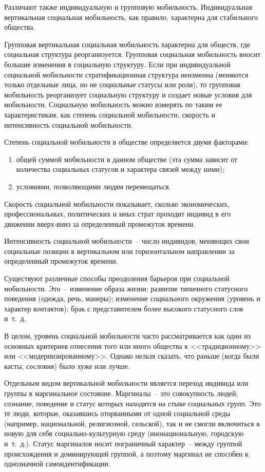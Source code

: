   Различают также индивидуальную и групповую мобильность. Индивидуальная
  вертикальная социальная мобильность, как правило, характерна для стабильного
  общества.

  Групповая вертикальная социальная мобильность характерна для обществ, где
  социальная структура реорганизуется. Групповая социальная мобильность вносит
  большие изменения в социальную структуру. Если при индивидуальной социальной
  мобильности стратификационная структура неизменна (меняются только отдельные
  лица, но не социальные статусы или роли), то групповая мобильность
  реорганизует социальную структуру и создает новые условия для мобильности.
  Социальную мобильность можно измерять по таким ее характеристикам, как
  степень социальной мобильности, скорость и интенсивность социальной
  мобильности.

  Степень социальной мобильности в обществе определяется двумя факторами:
  \begin{enumerate}
    \item общей суммой мобильности в данном обществе (эта сумма зависит от
      количества социальных статусов и характера связей между ними);
    \item условиями, позволяющими людям перемещаться.
  \end{enumerate}

  Скорость социальной мобильности показывает, сколько экономических,
  профессиональных, политических и иных страт проходит индивид в его движении
  вверх-вниз за определенный промежуток времени.

  Интенсивность социальной мобильности~-- число индивидов, меняющих свои
  социальные позиции в вертикальном или горизонтальном направлении за
  определенный промежуток времени.

  Существуют различные способы преодоления барьеров при социальной мобильности.
  Это~-- изменение образа жизни; развитие типичного статусного поведения
  (одежда, речь, манеры); изменение социального окружения (уровень и характер
  контактов); брак с представителем более высокого статусного слоя и~т.~д.

  В целом, уровень социальной мобильности часто рассматривается как один из
  основных критериев отнесения того или иного общества к <<традиционному>> или
  <<модернизированному>>. Однако нельзя сказать, что раньше (когда были касты,
  сословия) было хуже или лучше.

  Отдельным видом вертикальной мобильности является переход индивида или группы
  в маргинальное состояние. Маргиналы~-- это совокупность людей, сознание,
  поведение и статус которых находятся на стыке социальных групп. Это те люди,
  которые, оказавшись оторванными от одной социальной среды (например,
  национальной, религиозной, сельской), так и не смогли включиться в новую для
  себя социально-культурную среду (инонациональную, городскую и~т.~д.). Статус
  маргиналов носит пограничный характер~-- между группой происхождения и
  доминирующей группой, а поэтому маргинал не способен к однозначной
  самоидентификации.

